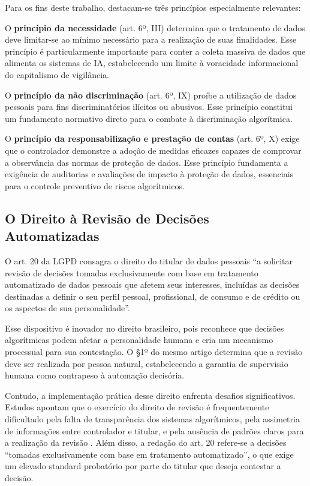 Para os fins deste trabalho, destacam-se três princípios especialmente relevantes:

O \textbf{princípio da necessidade} (art. 6º, III) determina que o tratamento de dados deve limitar-se ao mínimo necessário para a realização de suas finalidades. Esse princípio é particularmente importante para conter a coleta massiva de dados que alimenta os sistemas de IA, estabelecendo um limite à voracidade informacional do capitalismo de vigilância.

O \textbf{princípio da não discriminação} (art. 6º, IX) proíbe a utilização de dados pessoais para fins discriminatórios ilícitos ou abusivos. Esse princípio constitui um fundamento normativo direto para o combate à discriminação algorítmica.

O \textbf{princípio da responsabilização e prestação de contas} (art. 6º, X) exige que o controlador demonstre a adoção de medidas eficazes capazes de comprovar a observância das normas de proteção de dados. Esse princípio fundamenta a exigência de auditorias e avaliações de impacto à proteção de dados, essenciais para o controle preventivo de riscos algorítmicos.

\subsection{O Direito à Revisão de Decisões Automatizadas}
\label{subsec:revisao-automatizada}

O art. 20 da LGPD consagra o direito do titular de dados pessoais ``a solicitar revisão de decisões tomadas exclusivamente com base em tratamento automatizado de dados pessoais que afetem seus interesses, incluídas as decisões destinadas a definir o seu perfil pessoal, profissional, de consumo e de crédito ou os aspectos de sua personalidade''.

Esse dispositivo é inovador no direito brasileiro, pois reconhece que decisões algorítmicas podem afetar a personalidade humana e cria um mecanismo processual para sua contestação. O §1º do mesmo artigo determina que a revisão deve ser realizada por pessoa natural, estabelecendo a garantia de supervisão humana como contrapeso à automação decisória.

Contudo, a implementação prática desse direito enfrenta desafios significativos. Estudos apontam que o exercício do direito de revisão é frequentemente dificultado pela falta de transparência dos sistemas algorítmicos, pela assimetria de informações entre controlador e titular, e pela ausência de padrões claros para a realização da revisão \cite{Bioni2021PPD, Doneda2022DPD}. Além disso, a redação do art. 20 refere-se a decisões ``tomadas exclusivamente com base em tratamento automatizado'', o que exige um elevado standard probatório por parte do titular que deseja contestar a decisão.

